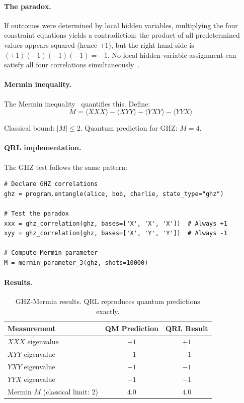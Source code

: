 \documentclass[submission,copyright,creativecommons]{eptcs}
\newcommand{\qrl}{\textsc{QRL}}
\begin{document}
\paragraph{The paradox.}
If outcomes were determined by local hidden variables, multiplying the four
constraint equations yields a contradiction: the product of all predetermined
values appears squared (hence $+1$), but the right-hand side is
$(+1)(-1)(-1)(-1) = -1$. No local hidden-variable assignment can satisfy all
four correlations simultaneously~\cite{mermin1990}.

\paragraph{Mermin inequality.}
The Mermin inequality~\cite{mermin1990} quantifies this. Define:
\begin{equation}
M = \langle XXX \rangle - \langle XYY \rangle - \langle YXY \rangle - \langle YYX \rangle
\end{equation}

Classical bound: $|M| \leq 2$. Quantum prediction for GHZ: $M = 4$.

\paragraph{QRL implementation.}
The GHZ test follows the same pattern:

\begin{lstlisting}
# Declare GHZ correlations
ghz = program.entangle(alice, bob, charlie, state_type="ghz")

# Test the paradox
xxx = ghz_correlation(ghz, bases=['X', 'X', 'X'])  # Always +1
xyy = ghz_correlation(ghz, bases=['X', 'Y', 'Y'])  # Always -1

# Compute Mermin parameter
M = mermin_parameter_3(ghz, shots=10000)
\end{lstlisting}

\paragraph{Results.}

\begin{table}[ht]
\centering
\begin{tabular}{lcc}
\toprule
\textbf{Measurement} & \textbf{QM Prediction} & \textbf{QRL Result} \\
\midrule
$XXX$ eigenvalue & $+1$ & $+1$ \\
$XYY$ eigenvalue & $-1$ & $-1$ \\
$YXY$ eigenvalue & $-1$ & $-1$ \\
$YYX$ eigenvalue & $-1$ & $-1$ \\
\midrule
Mermin $M$ (classical limit: 2) & $4.0$ & $4.0$ \\
\bottomrule
\end{tabular}
\caption{GHZ-Mermin results. \qrl{} reproduces quantum predictions exactly.}
\label{tab:mermin}
\end{table}
\end{document}
